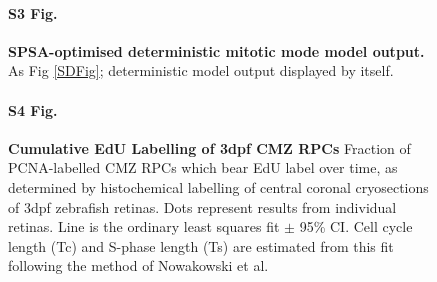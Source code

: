 \begin{figure}[p]
\paragraph{S3 Fig.}
\label{deterministicSupplement}
{\bf SPSA-optimised deterministic mitotic mode model output.} As Fig \ref{SDFig}; deterministic model output displayed by itself.
\end{figure}

\begin{figure}[h]
\paragraph{S4 Fig.}
\label{cumulativeSupplement}
{\bf Cumulative EdU Labelling of 3dpf CMZ RPCs} Fraction of PCNA-labelled CMZ RPCs which bear EdU label over time, as determined by histochemical labelling of central coronal cryosections of 3dpf zebrafish retinas. Dots represent results from individual retinas. Line is the ordinary least squares fit $\pm$ 95\% CI. Cell cycle length (Tc) and S-phase length (Ts) are estimated from this fit following the method of Nowakowski et al.\cite{Nowakowski1989}
\end{figure}